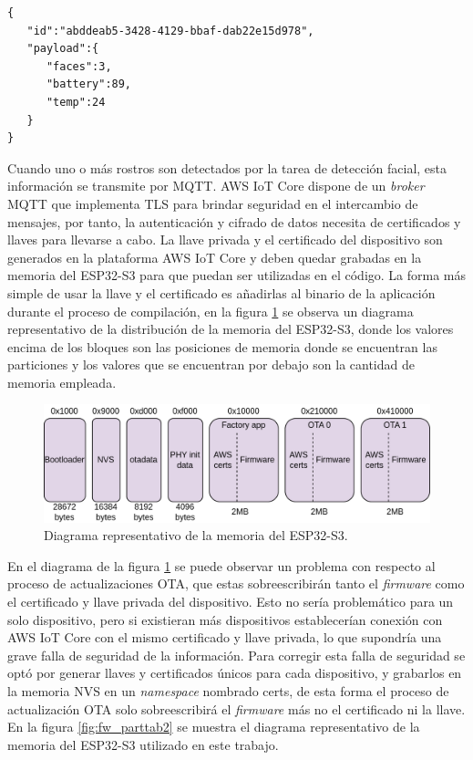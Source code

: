 \begin{lstlisting}[label=cod:message_json,caption=Formato de los mensajes a publicar.]
{
   "id":"abddeab5-3428-4129-bbaf-dab22e15d978",
   "payload":{
      "faces":3,
      "battery":89,
      "temp":24
   }
}
\end{lstlisting}

Cuando uno o más rostros son detectados por la tarea de detección facial, esta información se transmite por MQTT. AWS IoT Core dispone de un \textit{broker} MQTT que implementa TLS \cite{tls_doc} para brindar seguridad en el intercambio de mensajes, por tanto, la autenticación y cifrado de datos necesita de certificados y llaves para llevarse a cabo. La llave privada y el certificado del dispositivo son generados en la plataforma AWS IoT Core y deben quedar grabadas en la memoria del ESP32-S3 para que puedan ser utilizadas en el código. La forma más simple de usar la llave y el certificado es añadirlas al binario de la aplicación durante el proceso de compilación, en la figura \ref{fig:fw_parttab1} se observa un diagrama representativo de la distribución de la memoria del ESP32-S3, donde los valores encima de los bloques son las posiciones de memoria donde se encuentran las particiones y los valores que se encuentran por debajo son la cantidad de memoria empleada.

\begin{figure}[h]
	\centering
	\includegraphics[scale=0.22]{./Figures/fw_parttab1.png}
	\caption{Diagrama representativo de la memoria del ESP32-S3.}
	\label{fig:fw_parttab1}
\end{figure}

En el diagrama de la figura \ref{fig:fw_parttab1} se puede observar un problema con respecto al proceso de actualizaciones OTA, que estas sobreescribirán tanto el \textit{firmware} como el certificado y llave privada del dispositivo. Esto no sería problemático para un solo dispositivo, pero si existieran más dispositivos establecerían conexión con AWS IoT Core con el mismo certificado y llave privada, lo que supondría una grave falla de seguridad de la información. Para corregir esta falla de seguridad se optó por generar llaves y certificados únicos para cada dispositivo, y grabarlos en la memoria NVS en un \textit{namespace} nombrado certs, de esta forma el proceso de actualización OTA solo sobreescribirá el \textit{firmware} más no el certificado ni la llave. En la figura \ref{fig:fw_parttab2} se muestra el diagrama representativo de la memoria del ESP32-S3 utilizado en este trabajo.

